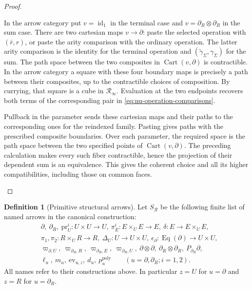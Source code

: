 \documentclass[oneside]{article}
\theoremstyle{plain}
\theoremstyle{definition}
\newtheorem{definition}[theorem]{Definition}
\theoremstyle{remark}
\newcommand{\Eq}{\operatorname{Eq}}
\newcommand{\RNU}{\mathcal R_{\infty}}
\newcommand{\id}{\operatorname{id}}
\begin{document}
\begin{proof}
\begin{enumerate}
In the arrow category put $v=\id_1$ in the terminal case and
$v=\partial_R\otimes\partial_R$ in the sum case. There are two
cartesian maps $v\to\partial$: paste the selected operation with
$(\bar r,r)$, or paste the arity comparison with the ordinary
operation. The latter arity comparison is the identity for the terminal
operation and $(\widetilde\gamma_\Sigma,\gamma_\Sigma)$ for the sum.
The path space between the two composites in
$\operatorname{Cart}(v,\partial)$ is contractible. In the arrow
category a square with these four boundary maps is precisely a path
between their composites, up to the contractible choices of
composition. By currying, that square is a cube in $\RNU$. Evaluation
at the two endpoints recovers both terms of the corresponding pair in
\eqref{eq:nu-operation-comparisons}.

Pullback in the parameter sends these cartesian maps and their paths
to the corresponding ones for the reindexed family. Pasting gives
paths with the prescribed composite boundaries. Over each parameter, the required space is the path space between
the two specified points of $\operatorname{Cart}(v,\partial)$.
The preceding calculation makes every such fiber contractible, hence
the projection of their dependent sum is an equivalence. This gives
the coherent choice and all its higher compatibilities, including
those on common faces.\qedhere

\end{enumerate}
\end{proof}



\begin{definition}[Primitive structural arrows]\label{def:nu-generators}
Let $S_{\mathcal R}$ be the following finite list of named arrows in the
canonical construction:
\begin{align*}
 &\partial,\ \partial_R,\ \mathrm{pr}_U^i:U\times U\to U,
 \ \pi_E^i:E\times_U E\to E,\ \delta:E\to E\times_U E,\\
 &\pi_1,\pi_2:R\times_U R\to R,
 \ \Delta_U:U\to U\times U,\ \epsilon_\partial:\Eq(\partial)\to U\times U,\\
 &\varpi_{\partial,U},\ \varpi_{\partial_R,R},
 \ \varpi_{\partial_R,E},\ \varpi_{\partial_R,U},
 \ \partial\otimes\partial,\ \partial_R\otimes\partial_R,
 \ P_{\partial_R}\partial,\\
 &\ell_u,\ m_u,\ \mathrm{ev}_{u,z},\ d_u,\ p_u^{\mathrm{poly}}
       \qquad(u=\partial,\partial_R; i=1,2).
\end{align*}
All names refer to their constructions above. In particular $z=U$ for
$u=\partial$ and $z=R$ for $u=\partial_R$.
\end{definition}
\end{document}
